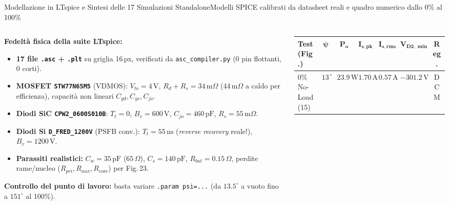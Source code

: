 \documentclass[aspectratio=169,9pt]{beamer}
\newcommand{\V}{\,\text{V}}
\newcommand{\A}{\,\text{A}}
\newcommand{\W}{\,\text{W}}
\newcommand{\pF}{\,\text{pF}}
\newcommand{\ns}{\,\text{ns}}
\newcommand{\Ohm}{\,\Omega}
\newcommand{\mOhm}{\,\text{m}\Omega}
\begin{document}
\begin{frame}{Modellazione in LTspice e Sintesi delle 17 Simulazioni Standalone}{Modelli SPICE calibrati da datasheet reali e quadro numerico dallo 0\% al 100\%}
  \begin{columns}[T,onlytextwidth]
    \begin{column}{0.39\textwidth}
      \scriptsize
      \textbf{\color{PrimaryBlue}Fedelt\`a fisica della suite LTspice:}
      \begin{itemize}\setlength{\itemsep}{2pt}
        \item \textbf{17 file \texttt{.asc} + \texttt{.plt}} su griglia 16\,px, verificati da \texttt{asc\_compiler.py} (0 pin flottanti, 0 corti).
        \item \textbf{MOSFET \texttt{STW77N65M5}} (VDMOS): $V_{to}=4\V$, $R_d+R_s=34\mOhm$ (44\,m$\Omega$ a caldo per efficienza), capacit\`a non lineari $C_{gd}, C_{gs}, C_{jo}$.
        \item \textbf{Diodi SiC \texttt{CPW2\_0600S010B}}: $T_t = 0$, $B_v=600\V$, $C_{jo}=460\pF$, $R_s=55\mOhm$.
        \item \textbf{Diodi Si \texttt{D\_FRED\_1200V}} (PSFB conv.): $T_t = 55\ns$ (\emph{reverse recovery} reale!), $B_v=1200\V$.
        \item \textbf{Parassiti realistici:} $C_w=35\pF$ ($65\Ohm$), $C_s=140\pF$, $R_{bat}=0.15\Ohm$, perdite rame/nucleo ($R_{pri}, R_{aux}, R_{\text{core}}$) per Fig.\,23.
      \end{itemize}
      \vspace*{1mm}
      \begin{formulabox}
        \textbf{Controllo del punto di lavoro:} basta variare \texttt{.param psi=...} (da $13.5^\circ$ a vuoto fino a $151^\circ$ al 100\%).
      \end{formulabox}
    \end{column}
    \begin{column}{0.59\textwidth}
      \centering
      \scriptsize
      \setlength{\tabcolsep}{2.6pt}
      \renewcommand{\arraystretch}{1.18}
      \begin{tabular}{@{}lcccccc@{}}
        \toprule
        \textbf{Test (Fig.)} & $\boldsymbol{\psi}$ & $\boldsymbol{P_o}$ & $\boldsymbol{I_{s,\text{pk}}}$ & $\boldsymbol{I_{s,\text{rms}}}$ & $\boldsymbol{V_{D2,\min}}$ & \textbf{Reg.} \\
        \midrule
        0\% No-Load (15) & $13.5^\circ$ & $23.9\W$ & $1.70\A$ & $0.57\A$ & $-301.2\V$ & DCM \\

\end{tabular}
\end{column}
\end{columns}
\end{frame}
\end{document}
